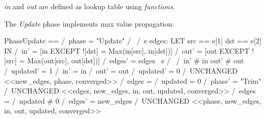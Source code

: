 \textit{in} and \textit{out} are defined as lookup table using
\textit{functions}.\\

\pagebreak

The \textit{Update} phase implements max value propagation:\\
\begin{tla}
PhaseUpdate == 
    /\ phase = "Update"
    /\ \/ /\ \E e \in edges: 
            LET 
                src == e[1]
                dst == e[2]
            IN 
                /\ in' = [in EXCEPT ![dst] = Max(in[src], in[dst])]
                /\ out' = [out EXCEPT ![src] = Max(out[src], out[dst])]
                /\ edges' = edges \ {e}
                /\ \/ /\ in' # in \/ out' # out
                      /\ updated' = 1
                   \/ /\ in' = in /\ out' = out
                      /\ updated' = 0
          /\ UNCHANGED <<new_edges, phase, converged>>
       \/ /\ edges = {}
          /\ updated = 0
          /\ phase' = "Trim"
          /\ UNCHANGED <<edges, new_edges, in, out, updated, converged>>
       \/ /\ edges = {}
          /\ updated # 0
          /\ edges' = new_edges
          /\ UNCHANGED <<phase, new_edges, in, out, updated, converged>>
\end{tla}
\begin{tlatex}
%
%
%
%
%
%
%
%
%
%
%
%
%
%
%
%
\end{tlatex}
\\

